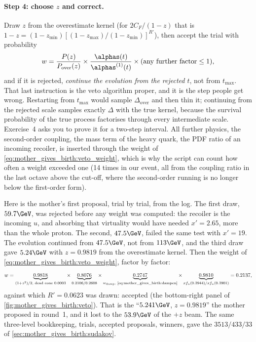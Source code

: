 \paragraph{Step 4: choose $z$ and correct.} Draw $z$ from the overestimate
kernel (for $2C_F/(1-z)$ that is $1-z=(1-z_{\min})[(1-z_{\max})/(1-z_{\min})]^{R'}$),
then accept the trial with probability
\begin{equation}
  w=\frac{P(z)}{P_{\mathrm{over}}(z)}\times\frac{\alphas(t)}{\alphas^{(1)}(t)}
  \times(\text{any further factor}\le1),
  \label{eq:mother_gives_birth:veto_weight}
\end{equation}
and if it is rejected, \emph{continue the evolution from the rejected $t$},
not from $t_{\max}$. That last instruction is the veto algorithm proper, and
it is the step people get wrong. Restarting from $t_{\max}$ would sample
$\Delta_{\mathrm{over}}$ and then thin it; continuing from the rejected scale
samples exactly $\Delta$ with the true kernel, because the survival
probability of the true process factorises through every intermediate scale.
Exercise~4 asks you to prove it for a two-step interval. All further physics,
the second-order coupling, the mass term of the heavy quark, the PDF ratio
of an incoming recoiler, is inserted through the weight of
\cref{eq:mother_gives_birth:veto_weight}, which is why the script can count
how often a weight exceeded one (14 times in our event, all from the
coupling ratio in the last octave above the cut-off, where the second-order
running is no longer below the first-order form).

Here is the mother's first proposal, trial by trial, from the 
log. The first draw, $59.7\GeV$, was rejected before any weight was
computed: the recoiler is the incoming $u$, and absorbing that virtuality
would have needed $x'=2.65$, more than the whole proton. The second,
$47.5\GeV$, failed the same test with $x'=19$. The evolution continued
from $47.5\GeV$, not from $113\GeV$, and the third draw gave $5.24\GeV$
with $z=0.9819$ from the overestimate kernel. Then the weight of
\cref{eq:mother_gives_birth:veto_weight}, factor by factor:
\begin{equation*}
  w=\underbrace{0.9818}_{(1+z^2)/2\text{, dead cone }0.0003}
  \times\underbrace{0.8076}_{0.2106/0.2608}
  \times\underbrace{0.2747}_{w_{\mathrm{damp}}\text{, \cref{eq:mother_gives_birth:dampen}}}
  \times\underbrace{0.9810}_{xf_u(0.3944)/xf_u(0.3901)}
  =0.2137 ,
\end{equation*}
against which $R'=0.0623$ was drawn: accepted (the bottom-right panel of
\cref{fig:mother_gives_birth:veto}). That is the ``$5.241\GeV$,
$z=0.9819$'' the mother proposed in round~1, and it lost to the
$53.9\GeV$ of the $+z$ beam. The same three-level bookkeeping, trials,
accepted proposals, winners, gave the $3513/433/33$ of
\cref{sec:mother_gives_birth:sudakov}.

